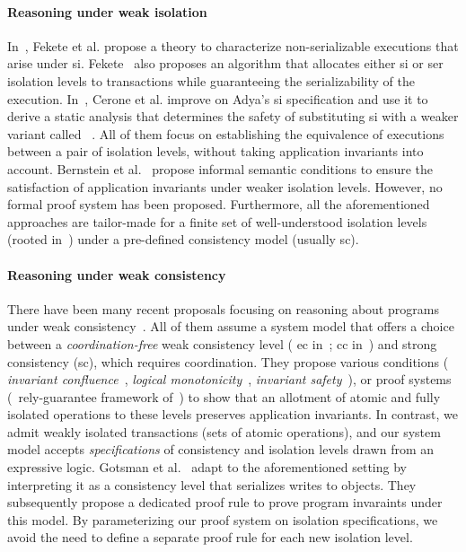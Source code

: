 \paragraph{Reasoning under weak isolation} In~\cite{feketessi}, Fekete
et al. propose a theory to characterize non-serializable executions
that arise under {\sc si}. Fekete~\cite{fekete2005} also proposes an
algorithm that allocates either {\sc si} or {\sc ser} isolation levels
to transactions while guaranteeing the serializability of the
execution. In~\cite{gotsmanpodc16}, Cerone et al. improve on Adya's
{\sc si} specification and use it to derive a static analysis that
determines the safety of substituting {\sc si} with a weaker variant
called ~\cite{psi}. All of them focus
on establishing the equivalence of executions between a pair of
isolation levels, without taking application invariants into account.
Bernstein et al.~\cite{bern2000} propose informal semantic conditions
to ensure the satisfaction of application invariants under weaker
isolation levels.  However, no formal proof system has been proposed.
Furthermore, all the aforementioned approaches are tailor-made for a
finite set of well-understood isolation levels (rooted
in~\cite{berenson}) under a pre-defined consistency model (usually
{\sc sc}). 

\paragraph{Reasoning under weak consistency} There have been many
recent proposals focusing on reasoning about programs under weak
consistency~\cite{bailisvldb, alvarocalm, gotsmanpopl16,redblueatc,
redblueosdi, ecinec}. All of them assume a system model that offers a
choice between a \emph{coordination-free} weak consistency level ({\sc
ec} in~\cite{redblueosdi, redblueatc, ecinec, alvarocalm, bailisvldb};
{\sc cc} in~\cite{gotsmanpopl16}) and strong consistency ({\sc sc}),
which requires coordination.  They propose various conditions (\eg
\emph{invariant confluence}~\cite{bailisvldb}, \emph{logical
monotonicity}~\cite{alvarocalm}, \emph{invariant
safety}~\cite{redblueatc}), or proof systems (\eg~rely-guarantee
framework of~\cite{gotsmanpopl16}) to show that an allotment of atomic
and fully isolated operations to these levels preserves application
invariants.  In contrast, we admit weakly isolated transactions (sets
of atomic operations), and our system model accepts
\emph{specifications} of consistency and isolation levels drawn from
an expressive logic. Gotsman et al.~\cite{gotsmanpopl16} adapt
 to the aforementioned setting by
interpreting it as a consistency level that serializes writes to
objects. They subsequently propose a dedicated proof rule to prove
program invaraints under this model. By parameterizing our proof
system on isolation specifications, we avoid the need to define a
separate proof rule for each new isolation level. 

